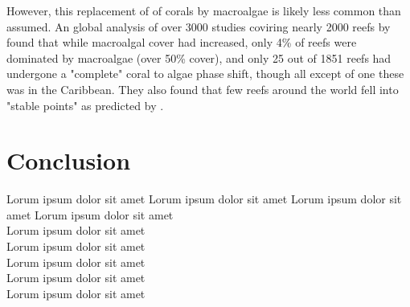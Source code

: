 \documentclass[11pt,a4paper]{article}
\begin{document}
However, this replacement of of corals by macroalgae is likely less common than assumed. An global analysis of over 3000 studies coviring nearly 2000 reefs by \cite{Bruno2009} found that while macroalgal cover had increased, only 4\% of reefs were dominated by macroalgae (over 50\% cover), and only 25 out of 1851 reefs had undergone a "complete" coral to algae phase shift, though all except of one these was in the Caribbean. They also found that few reefs around the world fell into "stable points" as predicted by \cite{Mumby2007}.

\section{Conclusion}
 Lorum ipsum dolor sit amet
  Lorum ipsum dolor sit amet
   Lorum ipsum dolor sit amet
    Lorum ipsum dolor sit amet\\
     Lorum ipsum dolor sit amet\\
      Lorum ipsum dolor sit amet\\
       Lorum ipsum dolor sit amet\\
        Lorum ipsum dolor sit amet\\
         Lorum ipsum dolor sit amet


\end{document}
